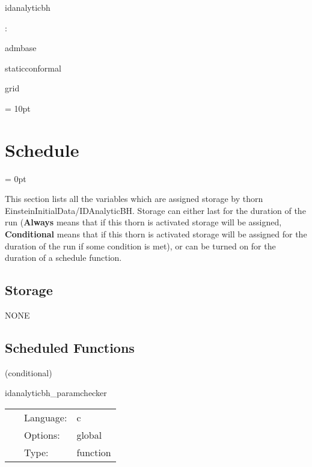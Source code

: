 \documentclass{article}
\begin{document}
idanalyticbh
\vspace{2mm}

: 

admbase

staticconformal

grid
\vspace{2mm}

\vspace{5mm}\parskip = 10pt 

\section{Schedule} 


\parskip = 0pt


\noindent This section lists all the variables which are assigned storage by thorn EinsteinInitialData/IDAnalyticBH.  Storage can either last for the duration of the run ({\bf Always} means that if this thorn is activated storage will be assigned, {\bf Conditional} means that if this thorn is activated storage will be assigned for the duration of the run if some condition is met), or can be turned on for the duration of a schedule function.


\subsection*{Storage}NONE
\subsection*{Scheduled Functions}
\vspace{5mm}

   (conditional) 

\hspace{5mm} idanalyticbh\_paramchecker 

\hspace{5mm}{\it construct parameters for analytic black hole solutions } 


\hspace{5mm}

 \begin{tabular*}{160mm}{cll} 
~ & Language:  & c \\ 
~ & Options:  & global \\ 
~ & Type:  & function \\ 
\end{tabular*} 


\vspace{5mm}
\end{document}
